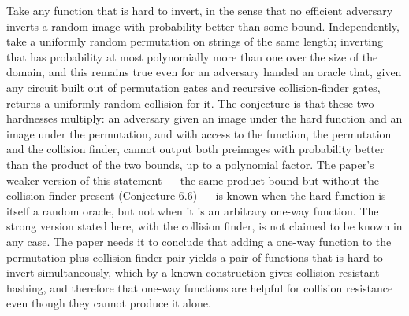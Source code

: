\documentclass{conjura-conjecture}
\begin{document}

\vspace{0.4em}

\begin{informalconjecture}
Take any function that is hard to invert, in the sense that no efficient
adversary inverts a random image with probability better than some bound.
Independently, take a uniformly random permutation on strings of the same
length; inverting that has probability at most polynomially more than one
over the size of the domain, and this remains true even for an adversary
handed an oracle that, given any circuit built out of permutation gates
and recursive collision-finder gates, returns a uniformly random collision
for it. The conjecture is that these two hardnesses multiply: an adversary
given an image under the hard function and an image under the permutation,
and with access to the function, the permutation and the collision finder,
cannot output both preimages with probability better than the product of
the two bounds, up to a polynomial factor. The paper's weaker version of
this statement --- the same product bound but without the collision finder
present (Conjecture 6.6) --- is known when the hard function is itself a
random oracle, but not when it is an arbitrary one-way function. The
strong version stated here, with the collision finder, is not claimed to
be known in any case. The paper needs it to conclude that adding a one-way
function to the permutation-plus-collision-finder pair yields a pair of
functions that is hard to invert simultaneously, which by a known
construction gives collision-resistant hashing, and therefore that one-way
functions are helpful for collision resistance even though they cannot
produce it alone.
\end{informalconjecture}
\end{document}
